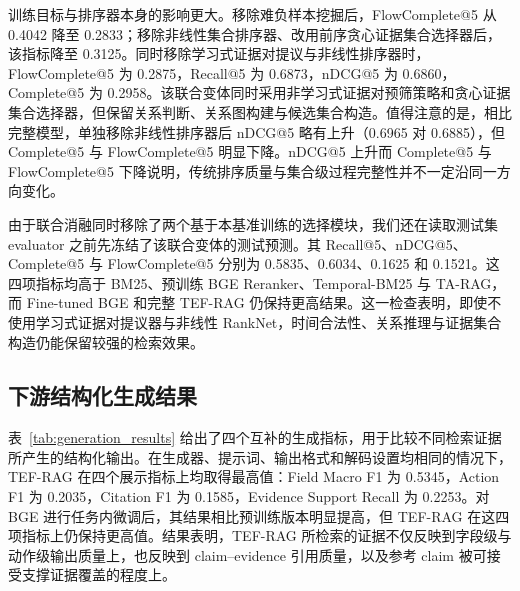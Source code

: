 训练目标与排序器本身的影响更大。移除难负样本挖掘后，FlowComplete@5 从 0.4042 降至 0.2833；移除非线性集合排序器、改用前序贪心证据集合选择器后，该指标降至 0.3125。同时移除学习式证据对提议与非线性排序器时，FlowComplete@5 为 0.2875，Recall@5 为 0.6873，nDCG@5 为 0.6860，Complete@5 为 0.2958。该联合变体同时采用非学习式证据对预筛策略和贪心证据集合选择器，但保留关系判断、关系图构建与候选集合构造。值得注意的是，相比完整模型，单独移除非线性排序器后 nDCG@5 略有上升（0.6965 对 0.6885），但 Complete@5 与 FlowComplete@5 明显下降。nDCG@5 上升而 Complete@5 与 FlowComplete@5 下降说明，传统排序质量与集合级过程完整性并不一定沿同一方向变化。

\begin{table}[t]
\caption{TEF-RAG 在验证集上的消融结果。}
\label{tab:ablation_results}
\centering
\small
\setlength{\tabcolsep}{3pt}
\end{table}

由于联合消融同时移除了两个基于本基准训练的选择模块，我们还在读取测试集 evaluator 之前先冻结了该联合变体的测试预测。其 Recall@5、nDCG@5、Complete@5 与 FlowComplete@5 分别为 0.5835、0.6034、0.1625 和 0.1521。这四项指标均高于 BM25、预训练 BGE Reranker、Temporal-BM25 与 TA-RAG，而 Fine-tuned BGE 和完整 TEF-RAG 仍保持更高结果。这一检查表明，即使不使用学习式证据对提议器与非线性 RankNet，时间合法性、关系推理与证据集合构造仍能保留较强的检索效果。

\subsection{下游结构化生成结果}
\label{sec:generation_results}

表~\ref{tab:generation_results} 给出了四个互补的生成指标，用于比较不同检索证据所产生的结构化输出。在生成器、提示词、输出格式和解码设置均相同的情况下，TEF-RAG 在四个展示指标上均取得最高值：Field Macro F1 为 0.5345，Action F1 为 0.2035，Citation F1 为 0.1585，Evidence Support Recall 为 0.2253。对 BGE 进行任务内微调后，其结果相比预训练版本明显提高，但 TEF-RAG 在这四项指标上仍保持更高值。结果表明，TEF-RAG 所检索的证据不仅反映到字段级与动作级输出质量上，也反映到 claim--evidence 引用质量，以及参考 claim 被可接受支撑证据覆盖的程度上。

